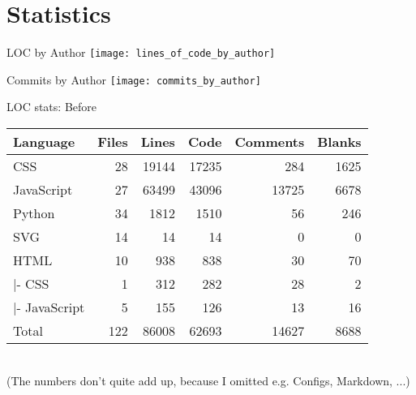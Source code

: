 \section{Statistics}

\begin{frame}[c]{LOC by Author}
    \texttt{[image: lines\_of\_code\_by\_author]}
\end{frame}

\begin{frame}[c]{Commits by Author}
    \texttt{[image: commits\_by\_author]}
\end{frame}



\begin{frame}[c,fragile]{LOC stats: Before}
    \large
    \begin{tabular}{l:r:r:r:r:r}
        Language & Files & Lines & Code & Comments & Blanks \\ \hline
CSS           &        28 &      19144 &      17235 &        284 &       1625 \\
JavaScript    &        27 &      63499 &      43096 &      13725 &       6678 \\ \hdashline
Python        &        34 &       1812 &       1510 &         56 &        246 \\
SVG           &        14 &         14 &         14 &          0 &          0 \\ \hdashline
HTML          &        10 &        938 &        838 &         30 &         70 \\
|- CSS        &         1 &        312 &        282 &         28 &          2 \\
|- JavaScript &         5 &        155 &        126 &         13 &         16 \\ \hdashline
Total         &       122 &      86008 &      62693 &      14627 &       8688 \\
    \end{tabular} \\
    \scriptsize \newline (The numbers don't quite add up, because I omitted e.g. Configs, Markdown, ...)
\end{frame}

